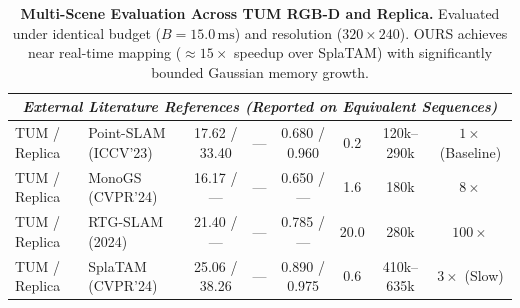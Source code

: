 \begin{table}[t]
{\begin{tabular}{llcccccc}
\midrule
\multicolumn{8}{c}{\textit{External Literature References (Reported on Equivalent Sequences)}} \\
\midrule
TUM / Replica & Point-SLAM (ICCV'23) & 17.62 / 33.40 & --- & 0.680 / 0.960 & 0.2 & 120k--290k & $1\times$ (Baseline) \\
TUM / Replica & MonoGS (CVPR'24) & 16.17 / --- & --- & 0.650 / --- & 1.6 & 180k & $8\times$ \\
TUM / Replica & RTG-SLAM (2024) & 21.40 / --- & --- & 0.785 / --- & 20.0 & 280k & $100\times$ \\
TUM / Replica & SplaTAM (CVPR'24) & 25.06 / 38.26 & --- & 0.890 / 0.975 & 0.6 & 410k--635k & $3\times$ (Slow) \\
\bottomrule
\end{tabular}
}
\caption{\textbf{Multi-Scene Evaluation Across TUM RGB-D and Replica.} Evaluated under identical budget ($B=15.0\,\mathrm{ms}$) and resolution ($320\times240$). OURS achieves near real-time mapping ($\approx 15\times$ speedup over SplaTAM) with significantly bounded Gaussian memory growth.}
\label{tab:multiscene_benchmark}
\end{table}